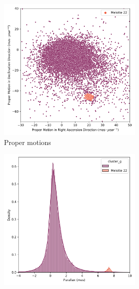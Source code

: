 \documentclass[11pt, a4paper, english]{book}
\begin{document}
\begin{figure}[htbp]
  \centering
  \begin{subfigure}{0.9\textwidth}
    \centering
    \begin{subfigure}[t]{0.45\textwidth}
      \centering
      \includegraphics[width=\textwidth]{../figures/melotte_22/pm_melotte_22.png}
      \caption{Proper motions}
      \label{fig:pm_melotte_22}
    \end{subfigure}
    \hfill
    \begin{subfigure}[t]{0.45\textwidth}
      \centering
      \includegraphics[width=\textwidth]{../figures/melotte_22/parallax_melotte_22.png}

\end{subfigure}
\end{subfigure}
\end{figure}
\end{document}
